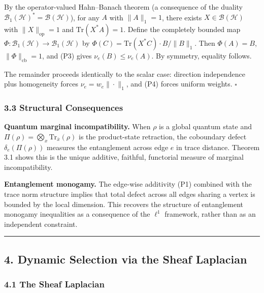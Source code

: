 \documentclass[
]{article}
\begin{document}
By the operator-valued Hahn--Banach theorem (a consequence of the
duality \(\mathcal{B}_1(\mathcal{H})^* = \mathcal{B}(\mathcal{H})\)),
for any \(A\) with \(\|A\|_1 = 1\), there exists
\(X \in \mathcal{B}(\mathcal{H})\) with \(\|X\|_{\mathrm{op}} = 1\) and
\(\mathrm{Tr}(X^* A) = 1\). Define the completely bounded map
\(\Phi: \mathcal{B}_1(\mathcal{H}) \to \mathcal{B}_1(\mathcal{H})\) by
\(\Phi(C) = \mathrm{Tr}(X^* C) \cdot B / \|B\|_1\). Then
\(\Phi(A) = B\), \(\|\Phi\|_{\mathrm{cb}} = 1\), and (P3) gives
\(\nu_e(B) \leq \nu_e(A)\). By symmetry, equality follows.

The remainder proceeds identically to the scalar case: direction
independence plus homogeneity forces \(\nu_e = w_e \|\cdot\|_1\), and
(P4) forces uniform weights. \(\square\)

\subsubsection{3.3 Structural
Consequences}\label{structural-consequences}

\textbf{Quantum marginal incompatibility.} When \(\rho\) is a global
quantum state and
\(\Pi(\rho) = \bigotimes_x \mathrm{Tr}_{\bar{x}}(\rho)\) is the
product-state retraction, the coboundary defect \(\delta_e(\Pi(\rho))\)
measures the entanglement across edge \(e\) in trace distance. Theorem
3.1 shows this is the unique additive, faithful, functorial measure of
marginal incompatibility.

\textbf{Entanglement monogamy.} The edge-wise additivity (P1) combined
with the trace norm structure implies that total defect across all edges
sharing a vertex is bounded by the local dimension. This recovers the
structure of entanglement monogamy inequalities as a consequence of the
\(\ell^1\) framework, rather than as an independent constraint.

\begin{center}\rule{0.5\linewidth}{0.5pt}\end{center}

\subsection{4. Dynamic Selection via the Sheaf
Laplacian}\label{dynamic-selection-via-the-sheaf-laplacian}

\subsubsection{4.1 The Sheaf Laplacian}\label{the-sheaf-laplacian}
\end{document}
